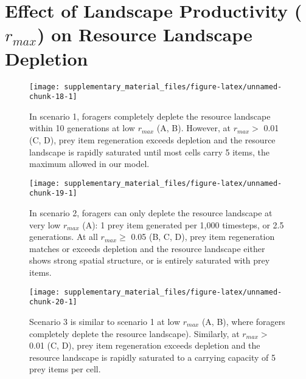 \documentclass[]{article}
\begin{document}
\newpage

\hypertarget{effect-of-landscape-productivity-r_max-on-resource-landscape-depletion}{%
\section{\texorpdfstring{Effect of Landscape Productivity (\(r_{max}\)) on Resource Landscape Depletion}{Effect of Landscape Productivity (r\_\{max\}) on Resource Landscape Depletion}}\label{effect-of-landscape-productivity-r_max-on-resource-landscape-depletion}}

\begin{figure}

{\centering \texttt{[image: supplementary\_material\_files/figure-latex/unnamed-chunk-18-1]} 

}

\caption{In scenario 1, foragers completely deplete the resource landscape within 10 generations at low $r_{max}$ (A, B). However, at $r_{max} >$ 0.01 (C, D), prey item regeneration exceeds depletion and the resource landscape is rapidly saturated until most cells carry 5 items, the maximum allowed in our model.}\label{fig:unnamed-chunk-18}
\end{figure}

\begin{figure}

{\centering \texttt{[image: supplementary\_material\_files/figure-latex/unnamed-chunk-19-1]} 

}

\caption{In scenario 2, foragers can only deplete the resource landscape at very low $r_{max}$ (A): 1 prey item generated per 1,000 timesteps, or 2.5 generations. At all $r_{max} \geq$ 0.05 (B, C, D), prey item regeneration matches or exceeds depletion and the resource landscape either shows strong spatial structure, or is entirely saturated with prey items.}\label{fig:unnamed-chunk-19}
\end{figure}

\begin{figure}

{\centering \texttt{[image: supplementary\_material\_files/figure-latex/unnamed-chunk-20-1]} 

}

\caption{Scenario 3 is similar to scenario 1 at low $r_{max}$ (A, B), where foragers completely deplete the resource landscape). Similarly, at $r_{max} >$ 0.01 (C, D), prey item regeneration exceeds depletion and the resource landscape is rapidly saturated to a carrying capacity of 5 prey items per cell.}\label{fig:unnamed-chunk-20}
\end{figure}
\end{document}
